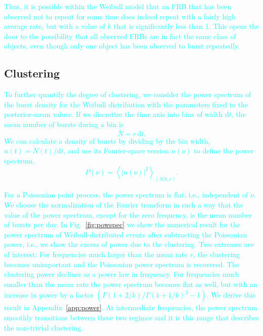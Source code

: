 \documentclass[fleqn,usenatbib]{mnras}
\newcommand{\new}[1]{\textcolor{cyan}{#1}}
\begin{document}
\new{Thus, it is possible within the Weibull model that an FRB that has been observed not to repeat for some time does indeed repeat with a fairly high average rate, but with a value of $k$ that is significantly less than 1. This opens the door to the possibility that all observed FRBs are in fact the same class of objects, even though only one object has been observed to burst repeatedly.}


\subsection{Clustering}
\label{sec:clustering}

\new{To further quantify the degree of clustering, we consider the power spectrum of the burst density for the Weibull distribution with the parameters fixed to the posterior-mean values. If we discretize the time axis into bins of width $\mathrm{d}t$, the mean number of bursts during a bin is
\begin{equation}
	\bar{N} = r\,\mathrm{d}t.
\end{equation}
We can calculate a density of bursts by dividing by the bin width, $n(t) = N(t)/\mathrm{d}t$, and use its Fourier-space version $n(\nu)$ to define the power spectrum,
\begin{equation}
	P(\nu) = \left< \left|n(\nu)\right|^2 \right>_{(N|k,r)}.
\end{equation}}

\new{For a Poissonian point process, the power spectrum is flat, i.e., independent of $\nu$. We choose the normalization of the Fourier transform in such a way that the value of the power spectrum, except for the zero frequency, is the mean number of bursts per day. In Fig.~\ref{fig:powspec} we show the numerical result for the power spectrum of Weibull-distributed events after subtracting the Poissonian power, i.e., we show the excess of power due to the clustering. Two extremes are of interest: For frequencies much larger than the mean rate $r$, the clustering becomes unimportant and the Poissonian power spectrum is recovered. The clustering power declines as a power law in frequency. For frequencies much smaller than the mean rate the power spectrum becomes flat as well, but with an increase in power by a factor $(\Gamma(1 + 2/k)/\Gamma(1 + 1/k)^2 - 1)$. We derive this result in Appendix~\ref{app:power}. At intermediate frequencies, the power spectrum smoothly transitions between these two regimes and it is this range that describes the non-trivial clustering.}
\end{document}
